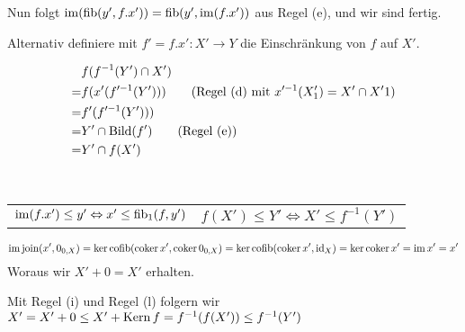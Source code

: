 \begin{bew}
Nun folgt $\operatorname{im}(\operatorname{fib}(y',f.x')) = \operatorname{fib}(y',\operatorname{im}(f.x'))$ aus Regel (e), und wir sind fertig.

Alternativ definiere mit $f' = f.x' : X' \to Y$ die Einschränkung von $f$ auf $X'$.

\begin{align*}
   & f(f^{-1}(Y')\cap X')
\\=& f(x'(f'^{-1}(Y'))) \qquad\text{(Regel (d) mit $x'^{-1}(X'_1) = X' \cap X'1$)}
\\=& f'(f'^{-1}(Y')))
\\=& Y' \cap \operatorname{Bild}(f') \qquad\text{(Regel (e))}
\\=& Y' \cap f(X')
\end{align*}
\end{bew}


\begin{lemm}[Regel (h)]
\ \linebreak

\begin{tabular}{ll}
$\operatorname{im}(f.x') \leq y' \Leftrightarrow x' \leq \operatorname{fib}_1(f,y')$
& $f(X') \leq Y' \Leftrightarrow X' \leq f^{-1}(Y')$
\end{tabular}
\end{lemm}
\begin{bew}
\[ \operatorname{im}\operatorname{join}(x',0_{0,X}) = \ker\operatorname{cofib}(\operatorname{coker} x', \operatorname{coker} 0_{0,X})
 = \ker\operatorname{cofib}(\operatorname{coker} x', \operatorname{id}_X) = \ker\operatorname{coker} x' = \operatorname{im} x' = x' \]
Woraus wir $X' + 0 = X'$ erhalten.

Mit Regel (i) und Regel (l) folgern wir $X' = X' + 0 \leq X' + \operatorname{Kern} f = f^{-1}(f(X')) \leq f^{-1}(Y')$
\end{bew}

